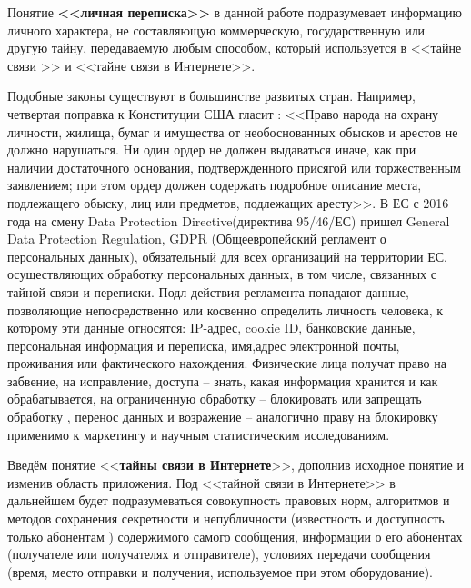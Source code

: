Понятие \textbf{<<личная переписка>>} в данной работе  подразумевает информацию личного характера, не составляющую коммерческую, государственную или другую тайну, передаваемую любым способом,  который  используется   в <<тайне связи >> и <<тайне связи в Интернете>>.

Подобные законы существуют в большинстве развитых стран. Например, четвертая поправка  к Конституции США  гласит : <<Право народа на охрану личности, жилища, бумаг и имущества от необоснованных обысков и арестов не должно нарушаться. Ни один ордер не должен выдаваться иначе, как при наличии достаточного основания, подтвержденного присягой или торжественным заявлением; при этом ордер должен содержать подробное описание места, подлежащего обыску, лиц или предметов, подлежащих аресту>>.%
В ЕС  с 2016 года  на смену Data Protection Directive(директива 95/46/ЕС) пришел General Data Protection Regulation, GDPR (Общеевропейский регламент о персональных данных), обязательный для всех организаций на территории ЕС, осуществляющих  обработку персональных данных, в том числе, связанных с тайной связи и переписки.   Подл действия регламента попадают данные, позволяющие непосредственно или косвенно определить личность человека, к которому эти данные относятся: IP-адрес, cookie ID, банковские данные, персональная информация и переписка, имя,адрес электронной почты, проживания или фактического нахождения. Физические лица получат право на забвение, на исправление, доступа -- знать, какая информация хранится и как обрабатывается, на ограниченную обработку -- блокировать или запрещать обработку , перенос данных и возражение -- аналогично праву на блокировку применимо к маркетингу и научным статистическим исследованиям.  



Введём понятие <<\textbf{тайны связи в Интернете}>>, дополнив исходное понятие и изменив область приложения. Под <<тайной связи в Интернете>> в дальнейшем будет подразумеваться совокупность правовых норм, алгоритмов и методов сохранения секретности и  непубличности (известность и доступность только абонентам ) содержимого самого сообщения, информации о его абонентах (получателе или получателях и отправителе), условиях передачи сообщения (время, место отправки и получения, используемое при этом оборудование). 

